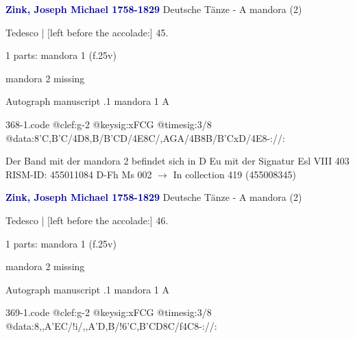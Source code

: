 \documentclass[twocolumn]{book}
\begin{document}
\newline \par \vspace{7pt} \textcolor{darkblue}{\textbf{Zink, Joseph Michael  1758-1829}}
\newline Deutsche Tänze - A
\newline mandora (2)
\newline \begin{itshape}[f.25v, at left:] Tedesco | [left before the accolade:] 45.\end{itshape} 
\newline \textcolor{darkblue}{}  1 parts: mandora 1  (f.25v)
\newline \begin{small} mandora 2 missing\end{small} 
\newline Autograph manuscript
.1  mandora 1  A  
\begin{filecontents*}{368-1.code}
@clef:g-2
@keysig:xFCG
@timesig:3/8
@data:8'C,B'C/4D8,B/B'CD/4E8C/,A{GA}/4B8B/B'CxD/4E8-://:
\end{filecontents*}
\newline
%

\newline Der Band mit der mandora 2 befindet sich in D Eu mit der Signatur Esl VIII 403
\newline RISM-ID: 455011084
\newline D-Fh  Ms 002
\newline $\rightarrow$ In collection 419 (455008345)
      
\newline \par \vspace{7pt} \textcolor{darkblue}{\textbf{Zink, Joseph Michael  1758-1829}}
\newline Deutsche Tänze - A
\newline mandora (2)
\newline \begin{itshape}[f.25v, at left:] Tedesco | [left before the accolade:] 46.\end{itshape} 
\newline \textcolor{darkblue}{}  1 parts: mandora 1  (f.25v)
\newline \begin{small} mandora 2 missing\end{small} 
\newline Autograph manuscript
.1  mandora 1  A  
\begin{filecontents*}{369-1.code}
@clef:g-2
@keysig:xFCG
@timesig:3/8
@data:8,,A'EC/!i/,,A'D,B/!{6'C,B'CD}8C/f4C8-://:
\end{filecontents*}
\newline
%
\end{document}
